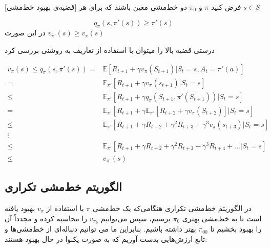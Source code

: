 

[قضیه‌ی بهبود خط‌مشی]
فرض کنید $\pi$ و 
$\pi_0$
دو خط‌مشی معین باشند که برای هر 
$s \in S$

$$q_\pi(s, \pi'(s)) \ge \pi'(s)$$
در این صورت 
$v_{\pi'}(s) \ge v_\pi(s)$

درستی قضیه بالا را می\nf توان با استفاده از تعاریف به روشنی بررسی کرد

\begin{align*}
v_\pi (s) \le q_\pi (s,\pi'(s)) = & \mathbb{E}\left[R_{t+1} + \gamma v_\pi(S_{t+1}) | S_t=s, A_t = \pi'(a)\right] \\
= & \mathbb{E}_{\pi'}\left[R_{t+1}+\gamma v_\pi(s_{t+1}) | S_t=s\right] \\
 \le &  \mathbb{E}_{\pi'}[R_{t+1}+ \gamma q_\pi(S_{t+1}, \pi'(S_{t+1})) | S_t=s] \\
= & \mathbb{E}_{\pi'}[R_{t+1} + \gamma \mathbb{E}_{\pi'}[R_{t+2} + \gamma v_\pi(S_{t+2})] | S_t=s] \\
\le & \mathbb{E}_{\pi'}[R_{t+1} + \gamma R_{t+2} + \gamma^2 R_{t+3} + \gamma^3 v_\pi(s_{t+3}) | S_t=s] \\
\vdots \\
\le & \mathbb{E}_{\pi'}[R_{t+1} + \gamma R_{t+2} + \gamma^2 R_{t+3} + \gamma^3 R_{t+4} + \dots | S_t=s] \\
\le & v_{\pi'}(s)
\end{align*}


\subsection{الگوریتم  خط‌مشی تکراری}
در الگوریتم خط‌مشی تکراری  هنگامی‌که یک خط‌مشی
$\pi$
 با استفاده از 
$v_{\pi}$
  بهبود یافته است تا به خط‌مشی بهتری
$\pi_0$
    برسیم، سپس می‌توانیم
$v_{\pi_0}$
    را محاسبه کرده و مجدداً آن را بهبود بخشیم تا
$\pi_{00}$
بهتر داشته باشیم.
بنابراین ما می توانیم دنباله‌ای از خط‌مشی‌ها و تابع ارزش‌هایی بدست آوریم که به صورت یکنوا در حال بهبود هستند:
%

